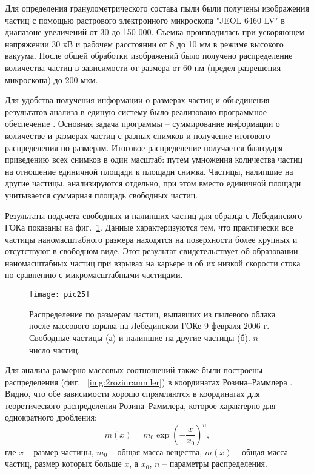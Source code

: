 Для определения гранулометрического состава пыли были получены изображения частиц с помощью растрового электронного микроскопа "JEOL 6460 LV" в диапазоне увеличений от 30 до 150 000. Съемка производилась при ускоряющем напряжении 30 кВ и рабочем расстоянии от 8 до 10 мм в режиме высокого вакуума. После общей обработки изображений было получено распределение количества частиц в зависимости от размера от 60 нм (предел разрешения микроскопа) до 200 мкм. 

Для удобства получения информации о размерах частиц и объединения результатов анализа в единую систему было реализовано программное обеспечение \cite{bib10}. Основная задача программы – суммирование информации о количестве и размерах частиц с разных снимков и получение итогового распределения по размерам. Итоговое распределение получается благодаря приведению всех снимков в один масштаб: путем умножения количества частиц на отношение единичной площади к площади снимка. Частицы, налипшие на другие частицы, анализируются отдельно, при этом вместо единичной площади учитывается суммарная площадь свободных частиц.

Результаты подсчета свободных и налипших частиц для образца с Лебединского ГОКа показаны на фиг.~\ref{img:2dispers}. Данные характеризуются тем, что практически все частицы наномасштабного размера находятся на поверхности более крупных и отсутствуют в свободном виде. Этот результат свидетельствует об образовании наномасштабных частиц при взрывах на карьере и об их низкой скорости стока по сравнению с микромасштабными частицами.

\begin{figure} [H] 
  \center
  \texttt{[image: pic25]}
  \caption{Распределение по размерам частиц, выпавших из пылевого облака после массового взрыва на Лебединском ГОКе 9 февраля 2006 г. Свободные частицы (а) и налипшие на другие частицы (б). $n$ – число частиц. } 
  \label{img:2dispers}  
\end{figure}

Для анализа размерно-массовых соотношений также были построены распределения (фиг. ~\ref{img:2rozinrammler}) в координатах Розина–Раммлера \cite{bib13}. Видно, что обе зависимости хорошо спрямляются в координатах для теоретического распределения Розина–Раммлера, которое характерно для однократного дробления: 
$$
m(x) = m_{0} \exp ⁡\left( - \frac{x}{x_{0}} \right) ^{n},
$$
где $x$ – размер частицы, $m_{0}$ – общая масса вещества, $m(x)$ – общая масса частиц, размер которых больше $x$, а $x_{0}$, $n$ – параметры распределения. 

